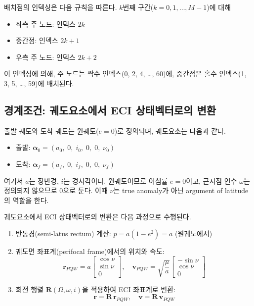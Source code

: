 \documentclass[11pt]{article}
\begin{document}
배치점의 인덱싱은 다음 규칙을 따른다. $k$번째 구간($k = 0, 1, \ldots, M-1$)에 대해
\begin{itemize}
  \item 좌측 주 노드: 인덱스 $2k$
  \item 중간점: 인덱스 $2k + 1$
  \item 우측 주 노드: 인덱스 $2k + 2$
\end{itemize}

이 인덱싱에 의해, 주 노드는 짝수 인덱스(0, 2, 4, \ldots, 60)에, 중간점은 홀수 인덱스(1, 3, 5, \ldots, 59)에 배치된다.


\subsection{경계조건: 궤도요소에서 ECI 상태벡터로의 변환}
\label{sec:boundary}

출발 궤도와 도착 궤도는 원궤도($e = 0$)로 정의되며, 궤도요소는 다음과 같다.
\begin{itemize}
  \item 출발: $\boldsymbol{\alpha}_0 = (a_0,\; 0,\; i_0,\; 0,\; 0,\; \nu_0)$
  \item 도착: $\boldsymbol{\alpha}_f = (a_f,\; 0,\; i_f,\; 0,\; 0,\; \nu_f)$
\end{itemize}

여기서 $a$는 장반경, $i$는 경사각이다. 원궤도이므로 이심률 $e = 0$이고, 근지점 인수 $\omega$는 정의되지 않으므로 0으로 둔다. 이때 $\nu$는 true anomaly가 아닌 argument of latitude의 역할을 한다.

궤도요소에서 ECI 상태벡터로의 변환은 다음 과정으로 수행된다.

\begin{enumerate}
  \item 반통경(semi-latus rectum) 계산: $p = a(1 - e^2) = a$ (원궤도에서)
  \item 궤도면 좌표계(perifocal frame)에서의 위치와 속도:
  \[
  \mathbf{r}_{PQW} = a \begin{bmatrix} \cos\nu \\ \sin\nu \\ 0 \end{bmatrix}, \quad \mathbf{v}_{PQW} = \sqrt{\frac{\mu}{a}} \begin{bmatrix} -\sin\nu \\ \cos\nu \\ 0 \end{bmatrix}
  \]
  \item 회전 행렬 $\mathbf{R}(\Omega, \omega, i)$을 적용하여 ECI 좌표계로 변환:
  \[
  \mathbf{r} = \mathbf{R}\, \mathbf{r}_{PQW}, \quad \mathbf{v} = \mathbf{R}\, \mathbf{v}_{PQW}
  \]
\end{enumerate}
\end{document}

